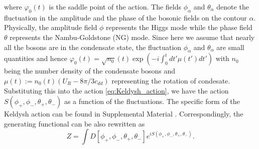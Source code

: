 \documentclass[aps,prl,twocolumn,superscriptaddress,]{revtex4-1}
\begin{document}
where $\varphi_{0}(t)$ is the saddle point of the action. The fields $\phi_{\alpha}$ and $\theta_{\alpha}$ denote the fluctuation
in the amplitude and the phase of the bosonic fields on the contour
$\alpha$. Physically, the amplitude field $\phi$ represents
the Higgs mode while the phase field $\theta$ represents the Nambu-Goldstone (NG) mode. Since
here we assume that nearly all the bosons are in the condensate state,
the fluctuation $\phi_{\alpha}$ and $\theta_{\alpha}$ are small
quantities and hence $\varphi_{0}(t)=\sqrt{n_0}(t)\exp(-i\int_0^t dt' \mu(t')dt')$ with $n_0$ being the number density of the condensate bosons and $\mu(t):=n_0(t)(U_R-8\pi/3c_{dd})$ representing the rotation of condesate. Substituting this into the action \eqref{eq:Keldysh_action}, we have the action $S(\phi_{+},\phi_{-},\theta_{+},\theta_{-})$ as
a function of the fluctuations. The specific form of the Keldysh action
can be found in Supplemental Material \citep{SupplementaryMaterial}.
Correspondingly, the generating functional can be also rewritten as
\begin{equation}
Z=\int D[\phi_{+},\phi_{-},\theta_{+},\theta_{-}]e^{iS(\phi_{+},\phi_{-},\theta_{+},\theta_{-})}.
\end{equation}
\end{document}
